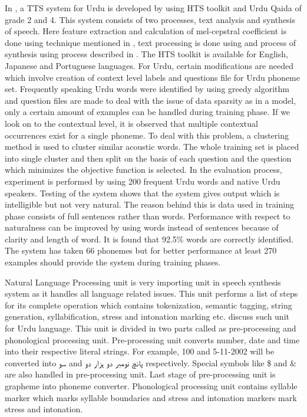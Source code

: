 In \cite{nawaz2014hidden}, a TTS system for Urdu is developed by using HTS toolkit and Urdu Qaida of grade 2 and 4. This system consists of two processes, text analysis and synthesis of speech. Here feature extraction and calculation of mel-cepstral coefficient is done using technique mentioned in \cite{fukada1992adaptive}, text processing is done using \cite{kabir2002natural} and process of synthesis using process described in \cite{tokuda2000speech}. The HTS toolkit is available for English, Japanese and Portuguese languages. For Urdu, certain modifications are needed which involve creation of context level labels and questions file for Urdu phoneme set. Frequently speaking Urdu words were identified by using greedy algorithm and question files are made to deal with the issue of data sparsity as in a model, only a certain amount of examples can be handled during training phase. If we look on to the contextual level, it is observed that multiple contextual occurrences exist for a single phoneme. To deal with this problem, a clustering method is used to cluster similar acoustic words. The whole training set is placed into single cluster and then split on the basis of each question and the question which minimizes the objective function is selected. In the evaluation process, experiment is performed by using 200 frequent Urdu words and native Urdu speakers. Testing of the system shows that the system gives output which is intelligible but not very natural. The reason behind this is data used in training phase consists of full sentences rather than words. Performance with respect to naturalness can be improved by using words instead of sentences because of clarity and length of word. It is found that 92.5\% words are correctly identified. The system has taken 66 phonemes but for better performance at least 270 examples should provide the system during training phases.

Natural Language Processing unit is very importing unit in speech synthesis system as it handles all language related issues. This unit performs a list of steps for its complete operation which contains tokenization, semantic tagging, string generation, syllabification, stress and intonation marking etc. \cite{saleem2002urdu, urdu_text_preprocessing} discuss such unit for Urdu language. This unit is divided in two parts called as pre-processing and phonological processing unit. Pre-processing unit converts number, date and time into their respective literal strings. For example, 100 and 5-11-2002 will be converted into \texturdu{سو} and \texturdu{پانچ نومبر دو ہزار دو} respectively. Special symbols like \$ and & are also handled in pre-processing unit. Last stage of pre-processing unit is grapheme into phoneme converter. Phonological processing unit contains syllable marker which marks syllable boundaries and stress and intonation markers mark stress and intonation.

